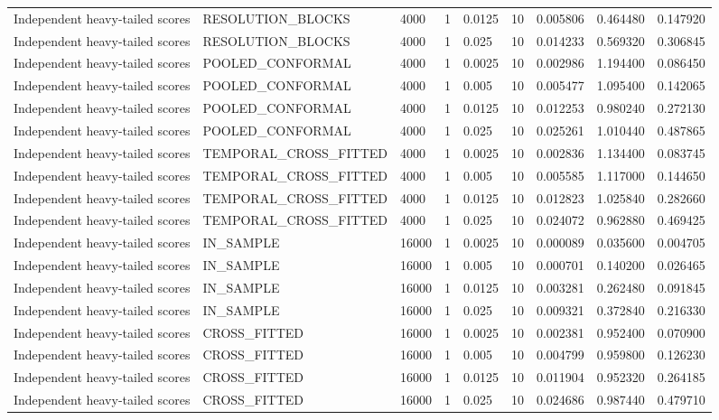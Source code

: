 \begin{tabular}{lllllllll}
Independent heavy-tailed scores & RESOLUTION\_BLOCKS & 4000 & 1 & 0.0125 & 10 & 0.005806 & 0.464480 & 0.147920 \\
Independent heavy-tailed scores & RESOLUTION\_BLOCKS & 4000 & 1 & 0.025 & 10 & 0.014233 & 0.569320 & 0.306845 \\
Independent heavy-tailed scores & POOLED\_CONFORMAL & 4000 & 1 & 0.0025 & 10 & 0.002986 & 1.194400 & 0.086450 \\
Independent heavy-tailed scores & POOLED\_CONFORMAL & 4000 & 1 & 0.005 & 10 & 0.005477 & 1.095400 & 0.142065 \\
Independent heavy-tailed scores & POOLED\_CONFORMAL & 4000 & 1 & 0.0125 & 10 & 0.012253 & 0.980240 & 0.272130 \\
Independent heavy-tailed scores & POOLED\_CONFORMAL & 4000 & 1 & 0.025 & 10 & 0.025261 & 1.010440 & 0.487865 \\
Independent heavy-tailed scores & TEMPORAL\_CROSS\_FITTED & 4000 & 1 & 0.0025 & 10 & 0.002836 & 1.134400 & 0.083745 \\
Independent heavy-tailed scores & TEMPORAL\_CROSS\_FITTED & 4000 & 1 & 0.005 & 10 & 0.005585 & 1.117000 & 0.144650 \\
Independent heavy-tailed scores & TEMPORAL\_CROSS\_FITTED & 4000 & 1 & 0.0125 & 10 & 0.012823 & 1.025840 & 0.282660 \\
Independent heavy-tailed scores & TEMPORAL\_CROSS\_FITTED & 4000 & 1 & 0.025 & 10 & 0.024072 & 0.962880 & 0.469425 \\
Independent heavy-tailed scores & IN\_SAMPLE & 16000 & 1 & 0.0025 & 10 & 0.000089 & 0.035600 & 0.004705 \\
Independent heavy-tailed scores & IN\_SAMPLE & 16000 & 1 & 0.005 & 10 & 0.000701 & 0.140200 & 0.026465 \\
Independent heavy-tailed scores & IN\_SAMPLE & 16000 & 1 & 0.0125 & 10 & 0.003281 & 0.262480 & 0.091845 \\
Independent heavy-tailed scores & IN\_SAMPLE & 16000 & 1 & 0.025 & 10 & 0.009321 & 0.372840 & 0.216330 \\
Independent heavy-tailed scores & CROSS\_FITTED & 16000 & 1 & 0.0025 & 10 & 0.002381 & 0.952400 & 0.070900 \\
Independent heavy-tailed scores & CROSS\_FITTED & 16000 & 1 & 0.005 & 10 & 0.004799 & 0.959800 & 0.126230 \\
Independent heavy-tailed scores & CROSS\_FITTED & 16000 & 1 & 0.0125 & 10 & 0.011904 & 0.952320 & 0.264185 \\
Independent heavy-tailed scores & CROSS\_FITTED & 16000 & 1 & 0.025 & 10 & 0.024686 & 0.987440 & 0.479710 \\

\end{tabular}
